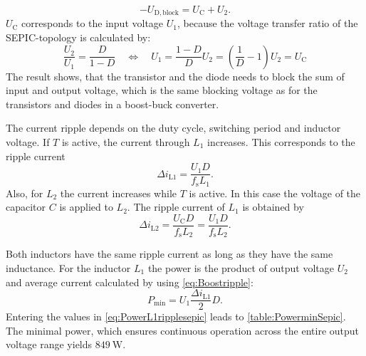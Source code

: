 \begin{solutionblock}
\begin{equation}
        -U_\mathrm{D,block}=U_\mathrm{C}+U_\mathrm{2}.
    \end{equation}
    $U_\mathrm{C}$ corresponds to the input voltage $U_\mathrm{1}$, because the voltage transfer ratio of the SEPIC-topology
    is calculated by:
    \begin{equation}
        \frac{U_\mathrm{2}}{U_\mathrm{1}}= \frac{D}{1-D} \quad \Leftrightarrow \quad 
        U_\mathrm{1}=\frac{1-D}{D}U_\mathrm{2}=\left( \frac{1}{D}-1\right)U_\mathrm{2}=U_\mathrm{C}
    \end{equation}
    The result shows, that the transistor and the diode needs to block the sum of input and output voltage, 
    which is the same blocking voltage as for the transistors and diodes in a boost-buck converter.
\end{solutionblock}


\begin{solutionblock}
    The current ripple depends on the duty cycle, switching period and inductor voltage. 
    If $T$ is active, the current through $L_1$ increases. This corresponds to the ripple current
    \begin{equation}
        \Delta i_\mathrm{L1}=\frac{U_\mathrm{1}D}{f_\mathrm{s}L_\mathrm{1}}.
    \end{equation}
    Also, for $L_2$ the current increases while $T$ is active. In this case the voltage of the capacitor $C$ is applied to $L_2$.
    The ripple current of $L_1$ is obtained by
    \begin{equation}
        \Delta i_\mathrm{L2}=\frac{U_\mathrm{C}D}{f_\mathrm{s}L_\mathrm{2}}=\frac{U_\mathrm{1}D}{f_\mathrm{s}L_\mathrm{2}}.
    \end{equation}
\end{solutionblock}


\begin{solutionblock}
    Both inductors have the same ripple current as long as they have the same inductance.
    For the inductor $L_1$ the power is the product of output voltage
     $U_\mathrm{2}$ and average current calculated by using \eqref{eq:Boostripple}:
    \begin{equation}
        P_\mathrm{min}=U_\mathrm{1}\frac{\Delta i_\mathrm{L1}}{2}D.
        \label{eq:PowerL1ripplesepic}
    \end{equation}
    Entering the values in \eqref{eq:PowerL1ripplesepic} leads to \autoref{table:PowerminSepic}. The minimal power, which ensures continuous operation across the entire output voltage range yields $\SI{849}{\watt}$.

\end{solutionblock}

